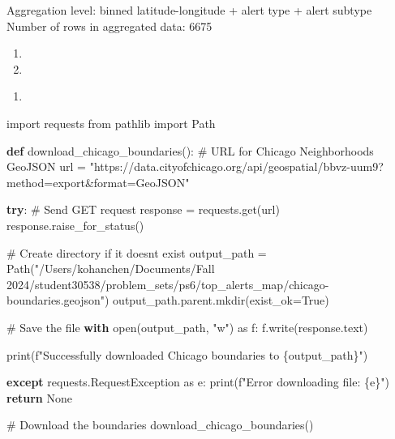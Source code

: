 \documentclass[
  letterpaper,
  DIV=11,
  numbers=noendperiod]{scrartcl}
\newenvironment{Shaded}{\begin{snugshade}}{\end{snugshade}}
\newcommand{\BuiltInTok}[1]{\textcolor[rgb]{0.00,0.23,0.31}{#1}}
\newcommand{\CommentTok}[1]{\textcolor[rgb]{0.37,0.37,0.37}{#1}}
\newcommand{\ControlFlowTok}[1]{\textcolor[rgb]{0.00,0.23,0.31}{\textbf{#1}}}
\newcommand{\ImportTok}[1]{\textcolor[rgb]{0.00,0.46,0.62}{#1}}
\newcommand{\KeywordTok}[1]{\textcolor[rgb]{0.00,0.23,0.31}{\textbf{#1}}}
\newcommand{\NormalTok}[1]{\textcolor[rgb]{0.00,0.23,0.31}{#1}}
\newcommand{\OperatorTok}[1]{\textcolor[rgb]{0.37,0.37,0.37}{#1}}
\newcommand{\SpecialCharTok}[1]{\textcolor[rgb]{0.37,0.37,0.37}{#1}}
\newcommand{\SpecialStringTok}[1]{\textcolor[rgb]{0.13,0.47,0.30}{#1}}
\newcommand{\StringTok}[1]{\textcolor[rgb]{0.13,0.47,0.30}{#1}}
\newcommand{\VariableTok}[1]{\textcolor[rgb]{0.07,0.07,0.07}{#1}}
\providecommand{\tightlist}{%
  \setlength{\itemsep}{0pt}\setlength{\parskip}{0pt}}\usepackage{longtable,booktabs,array}
\begin{document}
Aggregation level: binned latitude-longitude + alert type + alert
subtype Number of rows in aggregated data: 6675

\begin{enumerate}
\def\labelenumi{\arabic{enumi}.}
\setcounter{enumi}{1}
\tightlist
\item
\item
\end{enumerate}

\begin{enumerate}
\def\labelenumi{\alph{enumi}.}
\tightlist
\item
\end{enumerate}

\begin{Shaded}
\begin{Highlighting}[]
\ImportTok{import}\NormalTok{ requests}
\ImportTok{from}\NormalTok{ pathlib }\ImportTok{import}\NormalTok{ Path}

\KeywordTok{def}\NormalTok{ download\_chicago\_boundaries():}
    \CommentTok{\# URL for Chicago Neighborhoods GeoJSON}
\NormalTok{    url }\OperatorTok{=} \StringTok{"https://data.cityofchicago.org/api/geospatial/bbvz{-}uum9?method=export\&format=GeoJSON"}
    
    \ControlFlowTok{try}\NormalTok{:}
        \CommentTok{\# Send GET request}
\NormalTok{        response }\OperatorTok{=}\NormalTok{ requests.get(url)}
\NormalTok{        response.raise\_for\_status()  }
        
        \CommentTok{\# Create directory if it doesn\textquotesingle{}t exist}
\NormalTok{        output\_path }\OperatorTok{=}\NormalTok{ Path(}\StringTok{"/Users/kohanchen/Documents/Fall 2024/student30538/problem\_sets/ps6/top\_alerts\_map/chicago{-}boundaries.geojson"}\NormalTok{)}
\NormalTok{        output\_path.parent.mkdir(exist\_ok}\OperatorTok{=}\VariableTok{True}\NormalTok{)}
        
        \CommentTok{\# Save the file}
        \ControlFlowTok{with} \BuiltInTok{open}\NormalTok{(output\_path, }\StringTok{"w"}\NormalTok{) }\ImportTok{as}\NormalTok{ f:}
\NormalTok{            f.write(response.text)}
            
        \BuiltInTok{print}\NormalTok{(}\SpecialStringTok{f"Successfully downloaded Chicago boundaries to }\SpecialCharTok{\{}\NormalTok{output\_path}\SpecialCharTok{\}}\SpecialStringTok{"}\NormalTok{)}
        
    \ControlFlowTok{except}\NormalTok{ requests.RequestException }\ImportTok{as}\NormalTok{ e:}
        \BuiltInTok{print}\NormalTok{(}\SpecialStringTok{f"Error downloading file: }\SpecialCharTok{\{}\NormalTok{e}\SpecialCharTok{\}}\SpecialStringTok{"}\NormalTok{)}
        \ControlFlowTok{return} \VariableTok{None}

\CommentTok{\# Download the boundaries}
\NormalTok{download\_chicago\_boundaries()}
\end{Highlighting}
\end{Shaded}
\end{document}
